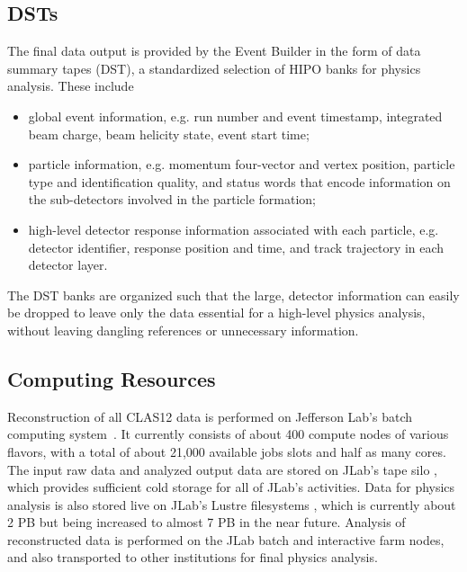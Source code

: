 \subsection{DSTs}\label{sec:dsts}
The final data output is provided by the Event Builder in the form of data summary tapes (DST), a standardized selection of HIPO banks for physics analysis.  These include
\begin{itemize}
    \item global event information, e.g. run number and event timestamp, integrated beam charge, beam helicity state, event start time;
    \item particle information, e.g. momentum four-vector and vertex position, particle type and identification quality, and status words that encode information on the sub-detectors involved in the particle formation;
    \item high-level detector response information associated with each particle, e.g. detector identifier, response position and time, and track trajectory in each detector layer.
\end{itemize}
The DST banks are organized such that the large, detector information can easily be dropped to leave only the data essential for a high-level physics analysis, without leaving dangling references or unnecessary information.

\subsection{Computing Resources}
Reconstruction of all CLAS12 data is performed on Jefferson Lab's batch computing system~\cite{jlab-batch-farm}.  It currently consists of about 400 compute nodes of various flavors, with a total of about 21,000 available jobs slots and half as many cores.  The input raw data and analyzed output data are stored on JLab's tape silo \cite{jlab-tape-silo}, which provides sufficient cold storage for all of JLab's activities.  Data for physics analysis is also stored live on JLab's Lustre filesystems \cite{jlab-lustre}, which is currently about 2 PB but being increased to almost 7 PB in the near future.  Analysis of reconstructed data is performed on the JLab batch and interactive farm nodes, and also transported to other institutions for final physics analysis.
